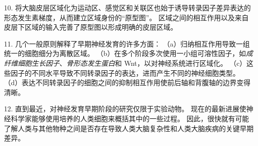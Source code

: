 10. 将大脑皮层区域化为运动区、感觉区和关联区也始于诱导转录因子差异表达的形态发生素梯度，从而建立区域身份的“原型图”。
区域之间的相互作用以及来自皮层下区域的输入完善了原型图以形成明确的皮层区域。 


11. 几个一般原则解释了早期神经发育的许多方面： 
（a）归纳相互作用导致一组统一的细胞细分为离散区域。
（b）在多个阶段多次使用一小组可溶性因子，如\textit{成纤维细胞生长因子}、\textit{骨形态发生蛋白}和 Wnt，以对神经系统进行区域化。
（c）这些因子的不同水平导致不同转录因子的表达，进而产生不同的神经细胞类型。
（d）表达不同转录因子的细胞之间的抑制相互作用使前后轴和背腹轴的边界变得清晰。


12. 直到最近，对神经发育早期阶段的研究仅限于实验动物。
现在的最新进展使神经科学家能够使用培养的人类细胞来概括其中的一些过程。
因此，很快就有可能了解人类与其他物种之间是否存在导致人类大脑复杂性和人类大脑疾病的关键早期差异。

